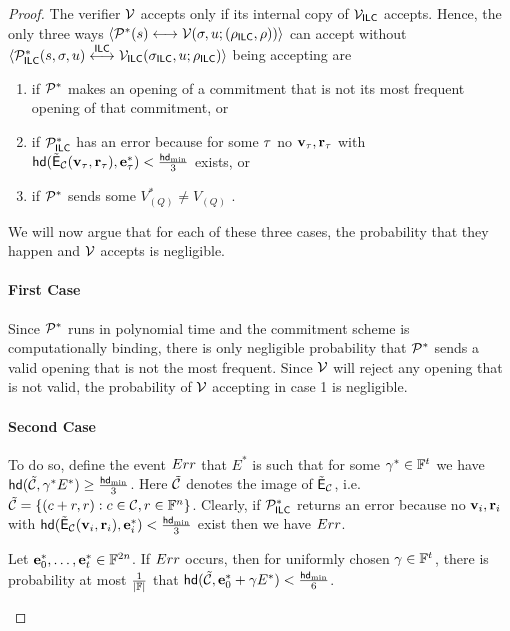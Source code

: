 \begin{proof}
The verifier $\mathcal{V}$ accepts only if its internal copy of $\mathcal{V}_{\mathsf{ILC}}$ accepts. Hence, the only three ways $ \langle \mathcal{P}^*(s)\longleftrightarrow\mathcal{V}(\mathsf{\sigma},u;(\rho_{\mathsf{ILC}},\rho))\rangle$ can accept without %
$\langle \mathcal{P}_{\mathsf{ILC}}^*(s,\mathsf{\sigma},u)\overset{\mathsf{ILC}}{\longleftrightarrow}\mathcal{V}_{\mathsf{ILC}}(\mathsf{\sigma}_{\mathsf{ILC}},u;\rho_{\mathsf{ILC}})\rangle$ being accepting are 
\begin{enumerate}
\item if $\mathcal{P}^*$ makes an opening of a commitment that is not its most frequent opening of that commitment, or
\item if $\mathcal{P}_{\mathsf{ILC}}^*$ has an error because for some $\tau$ no ${\mathbf{v}}_\tau,\mathbf{r}_\tau$ with $\mathsf{hd}(\tilde{\mathsf{E}}_{\mathcal{C}}({\mathbf{v}}_\tau,\mathbf{r}_\tau),\mathbf{e}^*_\tau)< \frac{\mathsf{hd}_{\mathrm{min}}}{3}$ exists, or
\item if $\mathcal{P}^*$ sends some $V_{(Q)}^*\neq V_{(Q)}$ .
\end{enumerate}
We will now argue that for each of these three cases, the probability that they happen and $\mathcal{V}$ accepts is negligible.

\paragraph{First Case} Since $\mathcal{P}^*$ runs in polynomial time and the commitment scheme is computationally binding, there is only negligible probability that $\mathcal{P}^*$ sends a valid opening that is not the most frequent. Since $\mathcal{V}$ will reject any opening that is not valid, the probability of $\mathcal{V}$ accepting in case 1 is negligible. 

\paragraph{Second Case} To do so, define the event $Err$ that $E^*$ is such that for some ${\mathbf{\gamma}}^*\in \mathbb{F}^{{t_{}}}$ we have $\mathsf{hd}(\tilde{\mathcal{C}}, {{\mathbf{\gamma}}^*} E^*)\geq \frac{\mathsf{hd}_{\mathrm{min}}}{3}$. Here $\tilde{\mathcal{C}}$ denotes the image of $\tilde{\mathsf{E}}_{\mathcal{C}}$, i.e. $\tilde{\mathcal{C}}=\{(c+r,r):c\in \mathcal{C}, r\in \mathbb{F}^n\}$. Clearly, if $\mathcal{P}_{\mathsf{ILC}}^*$ returns an error because no ${\mathbf{v}}_i,\mathbf{r}_i$ with $\mathsf{hd}(\tilde{\mathsf{E}}_{\mathcal{C}}({\mathbf{v}}_i,\mathbf{r}_i),\mathbf{e}^*_i)< \frac{\mathsf{hd}_{\mathrm{min}}}{3}$ exist then we have $Err$. 

\begin{lemma}\label{lem:proximity}
Let $\mathbf{e}^*_0,\ldots, \mathbf{e}^*_{{t_{}}}\in \mathbb{F}^{2n}$. If $Err$ occurs, then for uniformly chosen ${\mathbf{\gamma}}\in \mathbb{F}^{t_{}}$, there is probability at most $\frac{1}{|\mathbb{F} |}$ that $\mathsf{hd}(\tilde{\mathcal{C}},{\mathbf{e}^*_0}+{\mathbf{\gamma}} E^*)<\frac{\mathsf{hd}_{\mathrm{min}}}{6}$.
\end{lemma}


\end{proof}
